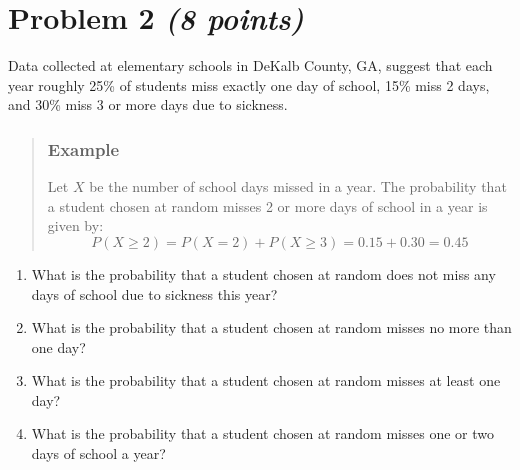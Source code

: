 \documentclass[11pt,twoside]{article}
\numberwithin{equation}{section}
\newcommand{\?}{\stackrel{?}{=}}
\newcommand{\ol}{\overline}
\newcommand{\bl}{\color{blue}}
\begin{document}
   \section*{Problem 2 \textit{(8 points)}}
Data collected at elementary schools in DeKalb County, GA, suggest that each
year roughly 25\% of students miss exactly one day of school, 15\% miss 2 days, and 30\% miss 3 or more days
due to sickness.
\vspace{-2ex}
\begin{quote}
    \subsubsection*{\bl Example}\small
    \bl   Let $X$ be the number of school days missed in a year. The probability that a student chosen at random misses 2 or more days of school in a year is given by:
    \begin{equation*}
      P(X \ge 2) = P(X=2) + P(X \ge 3) = 0.15 + 0.30 = 0.45
  \end{equation*}
\end{quote}
\begin{enumerate}[\bf (a)]
\item  What is the probability that a student chosen at random does not miss any days of school due to sickness
  this year?
 \vspace{18ex}
\item What is the probability that a student chosen at random misses no more than one day?
 \vspace{20ex}

\item What is the probability that a student chosen at random misses at least one day?
 \vspace{20ex}

 \item What is the probability that a student chosen at random misses one or two days of school a year?
 \vspace{25ex}

 

\end{enumerate}

\end{document}
